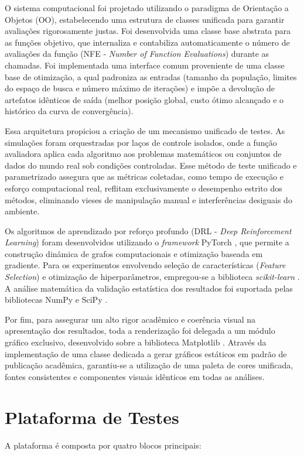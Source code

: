 \documentclass[12pt, a4paper, oneside]{report}
\begin{document}
O sistema computacional foi projetado utilizando o paradigma de Orientação a Objetos (OO), estabelecendo uma estrutura de classes unificada para garantir avaliações rigorosamente justas. Foi desenvolvida uma classe base abstrata para as funções objetivo, que internaliza e contabiliza automaticamente o número de avaliações da função (NFE - \textit{Number of Function Evaluations}) durante as chamadas. Foi implementada uma interface comum proveniente de uma classe base de otimização, a qual padroniza as entradas (tamanho da população, limites do espaço de busca e número máximo de iterações) e impõe a devolução de artefatos idênticos de saída (melhor posição global, custo ótimo alcançado e o histórico da curva de convergência).

Essa arquitetura propiciou a criação de um mecanismo unificado de testes. As simulações foram orquestradas por laços de controle isolados, onde a função avaliadora aplica cada algoritmo aos problemas matemáticos ou conjuntos de dados do mundo real sob condições controladas. Esse método de teste unificado e parametrizado assegura que as métricas coletadas, como tempo de execução e esforço computacional real, reflitam exclusivamente o desempenho estrito dos métodos, eliminando vieses de manipulação manual e interferências desiguais do ambiente.

Os algoritmos de aprendizado por reforço profundo (DRL - \textit{Deep Reinforcement Learning}) foram desenvolvidos utilizando o \textit{framework} PyTorch \cite{paszke2019pytorch}, que permite a construção dinâmica de grafos computacionais e otimização baseada em gradiente. Para os experimentos envolvendo seleção de características (\textit{Feature Selection}) e otimização de hiperparâmetros, empregou-se a biblioteca \textit{scikit-learn} \cite{pedregosa2011scikit}. A análise matemática da validação estatística dos resultados foi suportada pelas bibliotecas NumPy \cite{harris2020array} e SciPy \cite{virtanen2020scipy}.

Por fim, para assegurar um alto rigor acadêmico e coerência visual na apresentação dos resultados, toda a renderização foi delegada a um módulo gráfico exclusivo, desenvolvido sobre a biblioteca Matplotlib \cite{hunter2007matplotlib}. Através da implementação de uma classe dedicada a gerar gráficos estáticos em padrão de publicação acadêmica, garantiu-se a utilização de uma paleta de cores unificada, fontes consistentes e componentes visuais idênticos em todas as análises. 

\section{Plataforma de Testes}
A plataforma é composta por quatro blocos principais:
\end{document}

